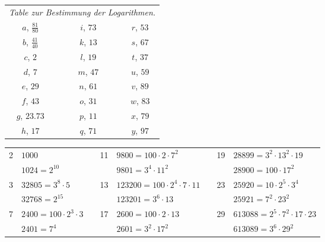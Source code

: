 \documentclass[10pt,a4paper]{article}
\begin{document}
\begin{center}
\small
\begin{tabular}{r l c r l c r l}
\multicolumn{8}{c}{\textit{Table zur Bestimmung der Logarithmen.}} \\[1ex]
\multicolumn{2}{c}{$a$, $\frac{81}{80}$} & \quad & \multicolumn{2}{c}{$i$, $73$} & \quad & \multicolumn{2}{c}{$r$, $53$} \\
\multicolumn{2}{c}{$b$, $\frac{41}{40}$} & & \multicolumn{2}{c}{$k$, $13$} & & \multicolumn{2}{c}{$s$, $67$} \\
\multicolumn{2}{c}{$c$, $2$} & & \multicolumn{2}{c}{$l$, $19$} & & \multicolumn{2}{c}{$t$, $37$} \\
\multicolumn{2}{c}{$d$, $7$} & & \multicolumn{2}{c}{$m$, $47$} & & \multicolumn{2}{c}{$u$, $59$} \\
\multicolumn{2}{c}{$e$, $29$} & & \multicolumn{2}{c}{$n$, $61$} & & \multicolumn{2}{c}{$v$, $89$} \\
\multicolumn{2}{c}{$f$, $43$} & & \multicolumn{2}{c}{$o$, $31$} & & \multicolumn{2}{c}{$w$, $83$} \\
\multicolumn{2}{c}{$g$, $23.73$} & & \multicolumn{2}{c}{$p$, $11$} & & \multicolumn{2}{c}{$x$, $79$} \\
\multicolumn{2}{c}{$h$, $17$} & & \multicolumn{2}{c}{$q$, $71$} & & \multicolumn{2}{c}{$y$, $97$} \\
\end{tabular}
\end{center}

\medskip

\begin{center}
\small
\begin{tabular}{r l c r l c r l}
2 & $1000$ & \quad & 11 & $9800 = 100 \cdot 2 \cdot 7^2$ & \quad & 19 & $28899 = 3^2 \cdot 13^2 \cdot 19$ \\
  & $1024 = 2^{10}$ & & & $9801 = 3^4 \cdot 11^2$ & & & $28900 = 100 \cdot 17^2$ \\[1ex]
3 & $32805 = 3^8 \cdot 5$ & & 13 & $123200 = 100 \cdot 2^4 \cdot 7 \cdot 11$ & & 23 & $25920 = 10 \cdot 2^5 \cdot 3^4$ \\
  & $32768 = 2^{15}$ & & & $123201 = 3^6 \cdot 13$ & & & $25921 = 7^2 \cdot 23^2$ \\[1ex]
7 & $2400 = 100 \cdot 2^3 \cdot 3$ & & 17 & $2600 = 100 \cdot 2 \cdot 13$ & & 29 & $613088 = 2^5 \cdot 7^2 \cdot 17 \cdot 23$ \\
  & $2401 = 7^4$ & & & $2601 = 3^2 \cdot 17^2$ & & & $613089 = 3^6 \cdot 29^2$ \\[1ex]
\end{tabular}
\end{center}
\end{document}
